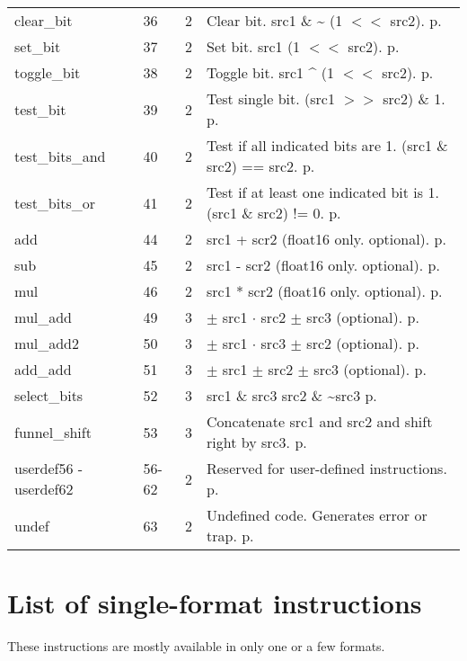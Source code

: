 \documentclass[forwardcom.tex]{subfiles}
\begin{document}
\begin{longtable} {|p{25mm}|p{12mm}|p{12mm}|p{100mm}|}
clear\_bit   & 36 & 2 & Clear bit. src1 \& \~{} (1 $<<$ src2). p. \pageref{table:clearBitInstruction}\\
set\_bit     & 37 & 2 & Set bit. src1 \textbar{} (1 $<<$ src2). p. \pageref{table:setBitInstruction}\\
toggle\_bit  & 38 & 2 & Toggle bit. src1 \^{} (1 $<<$ src2). p. \pageref{table:toggleBitInstruction}\\
test\_bit    & 39 & 2 & Test single bit. (src1 $>>$ src2) \& 1. p. \pageref{table:testBitInstruction}\\
test\_bits\_and & 40 & 2 & Test if all indicated bits are 1. (src1 \& src2) == src2. p. \pageref{table:testBitsAndInstruction} \\
test\_bits\_or  & 41 & 2 & Test if at least one indicated bit is 1. (src1 \& src2) != 0. p. \pageref{table:testBitsOrInstruction} \\
add          & 44 & 2 & src1 + scr2 (float16 only. optional). p. \pageref{table:addInstruction}\\
sub          & 45 & 2 & src1 - scr2 (float16 only. optional). p. \pageref{table:subInstruction}\\
mul          & 46 & 2 & src1 * scr2 (float16 only. optional). p. \pageref{table:mulInstruction}\\
mul\_add     & 49 & 3 & $\pm$ src1 $\cdot$ src2 $\pm$ src3 (optional). p. \pageref{table:mulAddInstruction}\\
mul\_add2    & 50 & 3 & $\pm$ src1 $\cdot$ src3 $\pm$ src2 (optional). p. \pageref{table:mulAddInstruction}\\
add\_add     & 51 & 3 & $\pm$ src1 $\pm$ src2 $\pm$ src3 (optional). p. \pageref{table:addAddInstruction}\\
select\_bits & 52 & 3 & src1 \& src3 \textbar{} src2 \& \~{}src3 p. \pageref{table:selectBitsInstruction}\\
funnel\_shift & 53 & 3 & Concatenate src1 and src2 and shift right by src3. p. \pageref{table:funnelShiftInstruction}\\
userdef56 - userdef62
             & 56-62 & 2 & Reserved for user-defined instructions. p. \pageref{table:userdefInstruction} \\
undef        & 63 & 2 & Undefined code. Generates error or trap. p. \pageref{table:undefInstruction} \\
\hline
\end{longtable}


\section{List of single-format instructions}
These instructions are mostly available in only one or a few formats.
\end{document}
